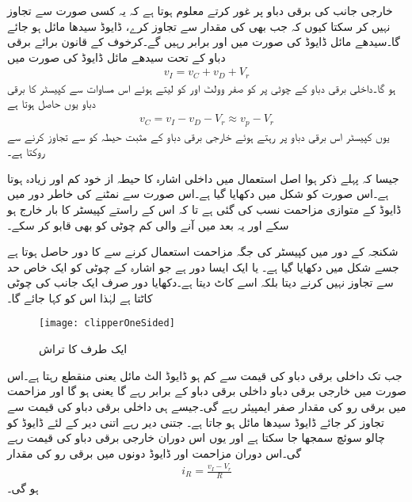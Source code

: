 خارجی جانب کی برقی دباو  پر غور کرتے معلوم ہوتا ہے کہ یہ کسی صورت  سے تجاوز نہیں کر سکتا کیوں کہ جب بھی  کی مقدار  سے تجاوز کرے،  ڈایوڈ سیدھا مائل ہو جائے گا۔سیدھے مائل ڈایوڈ کی صورت میں  اور  برابر رہیں گے۔کرخوف کے قانون برائے برقی دباو کے تحت سیدھے مائل ڈایوڈ کی صورت میں
\begin{align*}
v_I=v_C+v_D+V_r
\end{align*}
ہو گا۔داخلی برقی دباو کے چوٹی پر  کو صفر وولٹ اور  کو  لیتے ہوئے اس مساوات سے کپیسٹر کا برقی دباو یوں حاصل ہوتا ہے
\begin{align*}
v_C= v_I-v_D-V_r \approx v_p - V_r
\end{align*}
یوں کپیسٹر اس برقی دباو پر رہتے ہوئے خارجی برقی دباو کے مثبت حیطہ کو  سے تجاوز کرنے سے روکتا ہے۔

جیسا کہ پہلے ذکر ہوا اصل استعمال میں داخلی اشارہ کا حیطہ از خود کم اور زیادہ ہوتا ہے۔اس صورت کو شکل میں دکھایا گیا ہے۔اس صورت سے نمٹنے کی خاطر دور میں ڈایوڈ کے متوازی مزاحمت  نسب کی گئی ہے تا کہ اس کے راستے کپیسٹر کا بار خارج ہو سکے اور یہ بعد میں آنے والی کم چوٹی کو بھی قابو کر سکے۔



شکنجہ کے دور میں کپیسٹر کی جگہ مزاحمت استعمال کرنے سے   کا دور حاصل ہوتا ہے جسے شکل  میں دکھایا گیا ہے۔ یا  ایک ایسا دور ہے جو اشارہ کے چوٹی کو ایک خاص حد سے تجاوز نہیں کرنے دیتا بلکہ اسے کاٹ دیتا ہے۔دکھایا دور صرف ایک جانب کی چوٹی کاٹتا ہے لہٰذا اس کو  کہا جائے گا۔
 \begin{figure}
\centering
\texttt{[image: clipperOneSided]}
\caption{ایک طرف کا تراش}
\label{شکل_ایک_طرف_کا_تراش}
\end{figure}
جب تک داخلی برقی دباو کی قیمت  سے کم ہو ڈایوڈ الٹ مائل یعنی منقطع رہتا ہے۔اس صورت میں خارجی برقی دباو داخلی برقی دباو کے برابر رہے گا یعنی ہو گا اور مزاحمت   میں برقی رو کی مقدار صفر ایمپیئر رہے گی۔جیسے ہی داخلی برقی دباو  کی قیمت  سے تجاوز کر جائے ڈایوڈ سیدھا مائل ہو جاتا ہے۔ جتنی دیر   رہے اتنی دیر کے لئے  ڈایوڈ کو چالو سوئچ سمجھا جا سکتا ہے اور یوں اس دوران خارجی برقی دباو کی قیمت  رہے گی۔اس دوران مزاحمت اور ڈایوڈ دونوں میں برقی رو کی مقدار
\begin{align*}
i_R=\frac{v_I-V_r}{R}
\end{align*}
ہو گی۔

